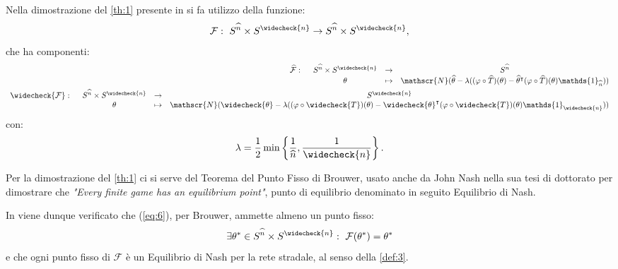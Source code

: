 Nella dimostrazione del \autoref{th:1} presente in \cite[Cap. 4]{MR4911797} si fa utilizzo della funzione:
\begin{equation}
    \mathcal{F}:\text{ } S^{\widehat{n}}\times S^{\widecheck{n}} \to S^{\widehat{n}}\times S^{\widecheck{n}},
    \label{eq:6}
\end{equation}
che ha componenti:
\begin{equation}
    \begin{split}
    \begin{array}{l c c c}
        \widehat{\mathcal{F}}:\text{ } & S^{\widehat{n}}\times S^{\widecheck{n}} & \to & S^{\widehat{n}}\\
        & \theta & \mapsto & \mathscr{N}(\widehat{\theta} - \lambda((\varphi\circ\widehat{T})(\theta)-\widehat{\theta}^{\intercal}(\varphi\circ\widehat{T})(\theta)\mathds{1}_{\widehat{n}})) 
    \end{array}\\
    \begin{array}{l c c c}
        \widecheck{\mathcal{F}}:\text{ } & S^{\widehat{n}}\times S^{\widecheck{n}} & \to & S^{\widecheck{n}}\\
        & \theta & \mapsto & \mathscr{N}(\widecheck{\theta} - \lambda((\varphi\circ\widecheck{T})(\theta)-\widecheck{\theta}^{\intercal}(\varphi\circ\widecheck{T})(\theta)\mathds{1}_{\widecheck{n}})) 
    \end{array}
    \end{split}
    \label{eq:7}
\end{equation}
con:
\begin{equation}
    \lambda=\frac{1}{2}\min\left\{\frac{1}{\widehat{n}},\frac{1}{\widecheck{n}}\right\}.
    \label{eq:8}
\end{equation}

Per la dimostrazione del \autoref{th:1} ci si serve del Teorema del Punto Fisso di Brouwer, usato anche da John Nash nella sua tesi di
dottorato \cite[Cap. 3]{nash1950noncooperative} per dimostrare che \textit{"Every finite game has an equilibrium point"}, punto di equilibrio
denominato in seguito Equilibrio di Nash.

In \cite[Cap. 4]{MR4911797} viene dunque verificato che (\autoref{eq:6}), per Brouwer, ammette almeno un punto fisso:
\begin{equation}
    \exists\theta^*\in S^{\widehat{n}}\times S^{\widecheck{n}}:\text{ } \mathcal{F}(\theta^*)=\theta^*
    \label{eq:9}
\end{equation}
e che ogni punto fisso di $\mathcal{F}$ è un Equilibrio di Nash per la rete stradale, al senso della \autoref{def:3}.

